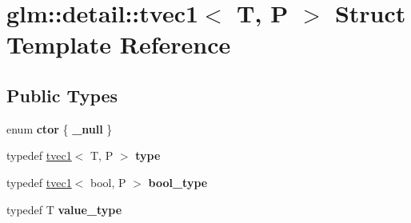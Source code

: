 \hypertarget{structglm_1_1detail_1_1tvec1}{\section{glm\-:\-:detail\-:\-:tvec1$<$ T, P $>$ Struct Template Reference}
\label{structglm_1_1detail_1_1tvec1}
}
\subsection*{Public Types}
\begin{DoxyCompactItemize}
\item 
enum {\bfseries ctor} \{ {\bfseries \-\_\-null}
 \}
\item 
\hypertarget{structglm_1_1detail_1_1tvec1_aaf46d49a966e6d66f8f9c6beb5a33afe}{typedef \hyperlink{structglm_1_1detail_1_1tvec1}{tvec1}$<$ T, P $>$ {\bfseries type}}\label{structglm_1_1detail_1_1tvec1_aaf46d49a966e6d66f8f9c6beb5a33afe}

\item 
\hypertarget{structglm_1_1detail_1_1tvec1_a9d5cbfb22c5b204382bede6efb1e96a2}{typedef \hyperlink{structglm_1_1detail_1_1tvec1}{tvec1}$<$ bool, P $>$ {\bfseries bool\-\_\-type}}\label{structglm_1_1detail_1_1tvec1_a9d5cbfb22c5b204382bede6efb1e96a2}

\item 
\hypertarget{structglm_1_1detail_1_1tvec1_ac69856e6aa1e97517e1edabc836a9c1a}{typedef T {\bfseries value\-\_\-type}}\label{structglm_1_1detail_1_1tvec1_ac69856e6aa1e97517e1edabc836a9c1a}

\end{DoxyCompactItemize}
